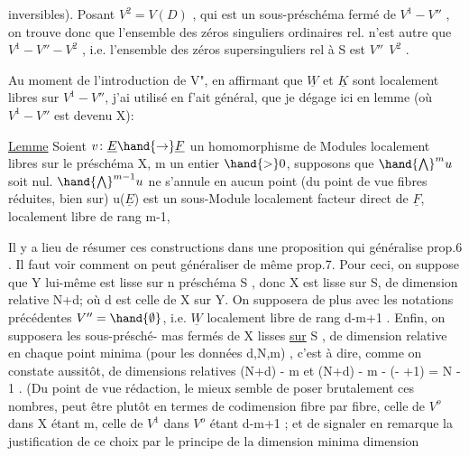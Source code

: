 
inversibles). Posant $V^2 = V(D)$ , qui est un sous-préschéma fermé de
$V^1-V''$ , on trouve donc que l'ensemble des  zéros singuliers
ordinaires rel. n'est autre que $V^1 - V'' - V^2$ , i.e. l'ensemble des
zéros supersinguliers  rel à S est $V''\ \ V^2$ .

\margin{$\|$} Au moment de l'introduction de V", en affirmant que $\underline{W}$ et $\underline{K}$ sont
localement libres sur $V^1-V''$, j'ai utilisé en f'ait général, que je dégage
ici en lemme (où $V^1-V''$ est devenu X):

\uline{Lemme} Soient $v\colon \underline{E} \hand{\to} \underline{F}$ un homomorphisme de Modules localement libres
sur le préschéma X,  m un entier $\hand{>}0$, supposons que $\hand{\bigwedge}^{m} u$ soit
nul.  
$\hand{\bigwedge}^{m-1} u$ ne s'annule en aucun point (du point de vue fibres réduites, bien
sur)   u($\underline{E}$) est un sous-Module localement facteur direct de $\underline{F}$,
localement libre de rang m-1, 

Il y a lieu de résumer ces constructions dans une proposition
qui généralise prop.6 . Il faut voir comment on peut généraliser de même
prop.7. Pour ceci, on suppose que Y lui-même est lisse sur n préschéma
S ,  donc X est lisse sur S, de dimension relative N+d\unsure{$^{\ast}$}; où d est celle de X
sur Y. On supposera de plus avec les notations précédentes $V''=\hand{\emptyset}$, i.e.
$\underline{W}$ localement libre de rang d-m+1 . Enfin, on supposera les sous-présché-%
mas fermés   de X lisses \uline{sur} S , de dimension relative  en chaque
point minima (pour les données d,N,m) ,  c'est à dire, comme
on constate aussitôt, de dimensions relatives (N+d) - m et
(N+d) - m - (- +1) = N - 1 . (Du point de vue rédaction, le mieux
semble de poser brutalement ces nombres, peut être plutôt en termes
de codimension fibre par fibre, celle de $V^o$ dans X étant m, celle de
$V^1$ dans $V^o$ étant d-m+1 ; et de signaler en remarque la justification
de ce choix par le principe de la dimension minima  dimension 


